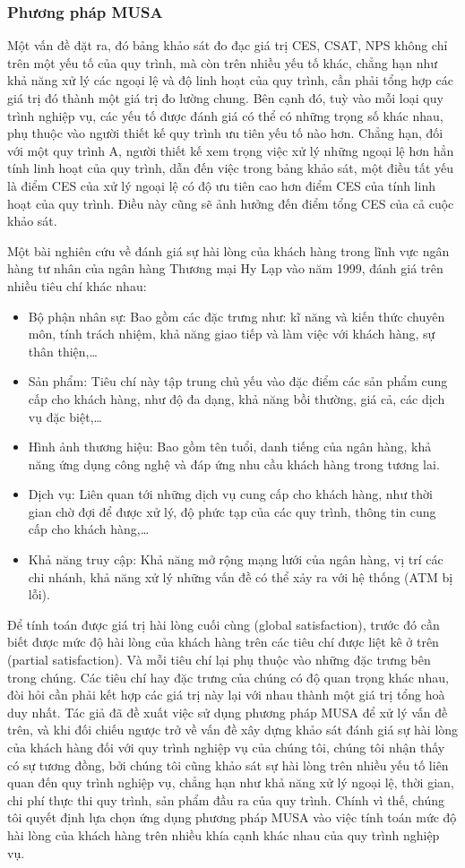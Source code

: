 \subsubsection{Phương pháp MUSA}
Một vấn đề đặt ra, đó bảng khảo sát đo đạc giá trị CES, CSAT, NPS không chỉ trên một yếu tố của quy trình, mà còn trên nhiều yếu tố khác, chẳng hạn như khả năng xử lý các ngoại lệ và độ linh hoạt của quy trình, cần phải tổng hợp các giá trị đó thành một giá trị đo lường chung. Bên cạnh đó, tuỳ vào mỗi loại quy trình nghiệp vụ, các yếu tố được đánh giá có thể có những trọng số khác nhau, phụ thuộc vào người thiết kế quy trình ưu tiên yếu tố nào hơn. Chẳng hạn, đối với một quy trình A, người thiết kế xem trọng việc xử lý những ngoại lệ hơn hẳn tính linh hoạt của quy trình, dẫn đến việc trong bảng khảo sát, một điều tất yếu là điểm CES của xử lý ngoại lệ có độ ưu tiên cao hơn điểm CES của tính linh hoạt của quy trình. Điều này cũng sẽ ảnh hưởng đến điểm tổng CES của cả cuộc khảo sát.
\par
Một bài nghiên cứu về đánh giá sự hài lòng của khách hàng trong lĩnh vực ngân hàng tư nhân của ngân hàng Thương mại Hy Lạp vào năm 1999, đánh giá trên nhiều tiêu chí khác nhau:
\begin{itemize}
    \item Bộ phận nhân sự: Bao gồm các đặc trưng như: kĩ năng và kiến thức chuyên môn, tính trách nhiệm, khả năng giao tiếp và làm việc với khách hàng, sự thân thiện,…
    \item Sản phẩm: Tiêu chí này tập trung chủ yếu vào đặc điểm các sản phẩm cung cấp cho khách hàng, như độ đa dạng, khả năng bồi thường, giá cả, các dịch vụ đặc biệt,…
    \item Hình ảnh thương hiệu: Bao gồm tên tuổi, danh tiếng của ngân hàng, khả năng ứng dụng công nghệ và đáp ứng nhu cầu khách hàng trong tương lai.
    \item Dịch vụ: Liên quan tới những dịch vụ cung cấp cho khách hàng, như thời gian chờ đợi để được xử lý, độ phức tạp của các quy trình, thông tin cung cấp cho khách hàng,…
    \item Khả năng truy cập: Khả năng mở rộng mạng lưới của ngân hàng, vị trí các chi nhánh, khả năng xử lý những vấn đề có thể xảy ra với hệ thống (ATM bị lỗi).
\end{itemize}
Để tính toán được giá trị hài lòng cuối cùng (global satisfaction), trước đó cần biết được mức độ hài lòng của khách hàng trên các tiêu chí được liệt kê ở trên (partial satisfaction). Và mỗi tiêu chí lại phụ thuộc vào những đặc trưng bên trong chúng. Các tiêu chí hay đặc trưng của chúng có độ quan trọng khác nhau, đòi hỏi cần phải kết hợp các giá trị này lại với nhau thành một giá trị tổng hoà duy nhất. Tác giả đã đề xuất việc sử dụng phương pháp MUSA để xử lý vấn đề trên, và khi đối chiếu ngược trở về vấn đề xây dựng khảo sát đánh giá sự hài lòng của khách hàng đối với quy trình nghiệp vụ của chúng tôi, chúng tôi nhận thấy có sự tương đồng, bởi chúng tôi cũng khảo sát sự hài lòng trên nhiều yếu tố liên quan đến quy trình nghiệp vụ, chẳng hạn như khả năng xử lý ngoại lệ, thời gian, chi phí thực thi quy trình, sản phẩm đầu ra của quy trình. Chính vì thế, chúng tôi quyết định lựa chọn ứng dụng phương pháp MUSA vào việc tính toán mức độ hài lòng của khách hàng trên nhiều khía cạnh khác nhau của quy trình nghiệp vụ. 
